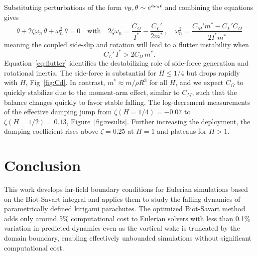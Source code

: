 \documentclass[lineno]{JFM-FLM_Au}
\begin{document}
Substituting perturbations of the form $v_{\cal B},\theta\sim e^{i\omega_n t}$ and combining the equations gives
\begin{equation}
    \ddot\theta + 2\zeta\omega_n\,\dot\theta+\omega_n^2\,\theta = 0 \quad\text{with}\quad 2\zeta\omega_n=\frac{C_\Omega}{I^*}- \frac{C_L'}{2m^*}\,,\quad \omega_n^2=\frac{C_M'm^*-C_L'C_\Omega}{2I^*m^*}
\end{equation}
meaning the coupled side-slip and rotation will lead to a flutter instability when
\begin{equation}
    C_L'\,I^* > 2C_\Omega\, m^*. \label{eq:flutter}
\end{equation}
Equation~\ref{eq:flutter} identifies the destabilizing role of side-force generation and rotational inertia. The side-force is substantial for $H\le1/4$ but drops rapidly with $H$, Fig~\ref{fig:Cd}. In contrast, $m^*\approx m/\rho R^3$ for all $H$, and we expect $C_\Omega$ to quickly stabilize due to the moment-arm effect, similar to $C_M$, such that the balance changes quickly to favor stable falling. The log-decrement measurements of the effective damping jump from $\zeta(H=1/4)=-0.07$ to $\zeta(H=1/2)=0.13$, Figure~\ref{fig:results}. Further increasing the deployment, the damping coefficient rises above $\zeta=0.25$ at $H=1$ and plateaus for $H>1$.

\section{Conclusion}\label{sec:conclusion}

This work develops far-field boundary conditions for Eulerian simulations based on the Biot-Savart integral and applies them to study the falling dynamics of parametrically defined kirigami parachutes. The optimized Biot-Savart method adds only around 5\% computational cost to Eulerian solvers with less than 0.1\% variation in predicted dynamics even as the vortical wake is truncated by the domain boundary, enabling effectively unbounded simulations without significant computational cost.
\end{document}
